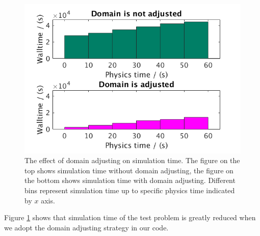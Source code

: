 \documentclass[conference,compsoc]{IEEEtran}
\begin{document}
\begin{figure}[!t]
\centering
\includegraphics[scale=0.35]{adj_vs_no}
\caption{The effect of domain adjusting on simulation time. The figure on the top shows simulation time without domain adjusting, the figure on the bottom shows simulation time with domain adjusting. Different bins represent simulation time up to specific physics time indicated by $x$ axis.}
\label{fig:adj_vs_no}
\end{figure}
Figure \ref{fig:adj_vs_no} shows that simulation time of the test problem is greatly reduced when we adopt the domain adjusting strategy in our code.
\end{document}
